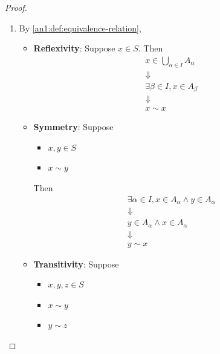 \begin{proof}
  \leavevmode\par
  \begin{enumerate}[label=\textbf{(\Alph*)}]
    \item By \cref{an1:def:equivalence-relation},
          \begin{itemize}
            \item \textbf{Reflexivity}: Suppose $x \in S$. Then
                  \[
                    \begin{array}{c}
                      x \in \bigcup_{\alpha \in I} A_{\alpha} \\
                      \Downarrow                              \\
                      \exists \beta \in I, x \in A_{\beta}    \\
                      \Downarrow                              \\
                      x \sim x
                    \end{array}
                  \]
            \item \textbf{Symmetry}: Suppose
                  \begin{itemize}
                    \item $x, y \in S$
                    \item $x \sim y$
                  \end{itemize}
                  Then
                  \[
                    \begin{array}{c}
                      \exists \alpha \in I, x \in A_{\alpha} \land y \in A_{\alpha} \\
                      \Downarrow                                                    \\
                      y \in A_{\alpha} \land x \in A_{\alpha}                       \\
                      \Downarrow                                                    \\
                      y \sim x
                    \end{array}
                  \]
            \item \textbf{Transitivity}: Suppose
                  \begin{itemize}
                    \item $x, y, z \in S$
                    \item $x \sim y$
                    \item $y \sim z$

\end{itemize}
\end{itemize}
\end{enumerate}
\end{proof}
